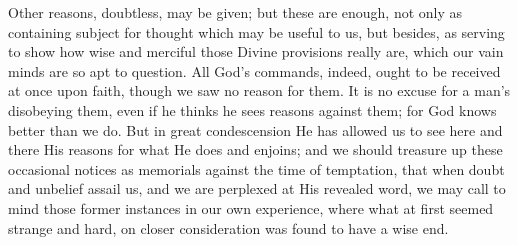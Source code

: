 Other reasons, doubtless, may be given; but these are
enough, not only as containing subject for thought which
may be useful to us, but besides, as serving to show how
wise and merciful those Divine provisions really are,
which our vain minds are so apt to question. All God's
commands, indeed, ought to be received at once upon
faith, though we saw no reason for them. It is no excuse
for a man's disobeying them, even if he thinks he sees
reasons against them; for God knows better than we do.
But in great condescension He has allowed us to see here
and there His reasons for what He does and enjoins; and
we should treasure up these occasional notices as
memorials against the time of temptation, that when doubt
and unbelief assail us, and we are perplexed at His
revealed word, we may call to mind those former instances
in our own experience, where what at first seemed strange
and hard, on closer consideration was found to have a
wise end.


